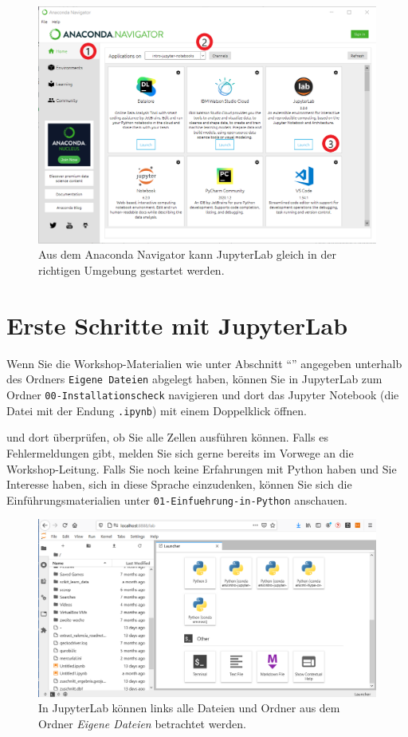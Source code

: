 \documentclass{tufte-handout}
\begin{document}
\begin{figure}[h]
  \includegraphics{anaconda-navigator-jupyterlab--mit-reihenfolge}
  \caption{Aus dem Anaconda Navigator kann JupyterLab gleich in der richtigen Umgebung gestartet werden.}%
\label{fig:start-jupyterlab}
\end{figure}

\section{Erste Schritte mit JupyterLab}

Wenn Sie die Workshop-Materialien wie unter Abschnitt \enquote{} angegeben unterhalb des Ordners \texttt{Eigene Dateien} abgelegt haben, 
können Sie in JupyterLab zum Ordner 
\texttt{00-Installationscheck}
navigieren und dort das Jupyter Notebook (die Datei mit der Endung \texttt{.ipynb}) mit einem Doppelklick öffnen.

 und dort überprüfen, ob Sie alle Zellen ausführen können.
Falls es Fehlermeldungen gibt, melden Sie sich gerne bereits im Vorwege an die Workshop-Leitung.
Falls Sie noch keine Erfahrungen mit Python haben und Sie Interesse haben, sich in diese Sprache einzudenken,
können Sie sich die Einführungsmaterialien unter
\texttt{01-Einfuehrung-in-Python}
anschauen.

\begin{figure}[h]
  \includegraphics{jupyterlab-running}
  \caption{In JupyterLab können links alle Dateien und Ordner aus dem Ordner \emph{Eigene Dateien} betrachtet werden.}%
\label{fig:start-jupyterlab}
\end{figure}
\end{document}
